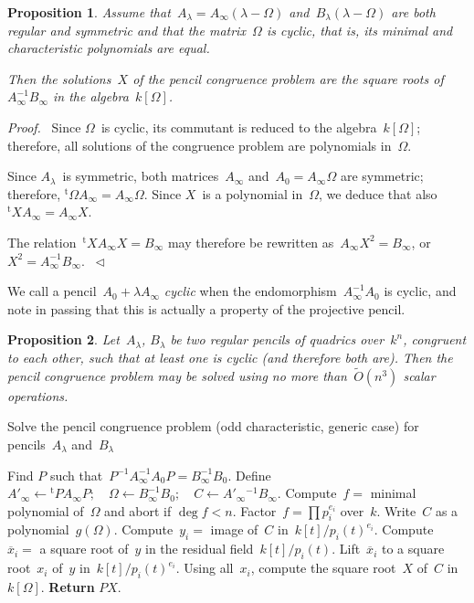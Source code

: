 \documentclass{article}
\newtheorem{prop}{Proposition}
\newenvironment{proof}{\textit{Proof.}~}{~$\lhd$}
\def\transpose#1{{}^{\mathrm{t}}\!#1}
\def\Otilde#1{\ensuremath{\widetilde O\left(#1\right)}}
\begin{document}
\begin{prop}
Assume that~$A_{\lambda} = A_{\infty} (\lambda - \Omega)$ and~$B_{\lambda} (\lambda - \Omega)$ are both regular
and symmetric and that the matrix~$\Omega$ is cyclic, that is, its minimal and
characteristic polynomials are equal.

Then the solutions~$X$ of the pencil congruence problem are the square
roots of~$A_{\infty}^{-1} B_{\infty}$ in the algebra~$k[\Omega]$.
\end{prop}

\begin{proof}
Since $\Omega$~is cyclic, its commutant is reduced to the algebra~$k[\Omega]$;
therefore, all solutions of the congruence problem are polynomials
in~$\Omega$.

Since $A_{\lambda}$~is symmetric, both matrices~$A_{\infty}$ and~$A_{0} = A_{\infty} \Omega$
are symmetric; therefore, $\transpose{\Omega} A_{\infty} = A_{\infty} \Omega$. Since $X$~is a
polynomial in~$\Omega$, we deduce that also~$\transpose{X} A_{\infty} = A_{\infty} X$.

The relation~$\transpose{X} A_{\infty} X = B_{\infty}$ may therefore be rewritten
as~$A_{\infty} X^2 = B_{\infty}$, or~$X^2 = A_{\infty}^{-1} B_{\infty}$.
\end{proof}

We call a pencil~$A_0 + \lambda A_{\infty}$ \emph{cyclic} when the
endomorphism~$A_{\infty}^{-1} A_0$ is cyclic, and note in passing that
this is actually a property of the projective pencil.

\begin{prop}
Let~$A_{\lambda}$, $B_{\lambda}$ be two regular pencils of quadrics
over~$k^n$, congruent to each other, such that at least one is cyclic
(and therefore both are). Then the pencil congruence problem may be
solved using no more than~\Otilde{n^3} scalar operations.
\end{prop}

\begin{algorithm}
\caption{Solve the pencil congruence problem (odd characteristic, generic
case) for pencils~$A_{\lambda}$ and~$B_{\lambda}$}
\begin{algorithmic}[1]
\State\label{step:jordan}%
  Find $P$ such that~$P^{-1} A_{\infty}^{-1} A_0 P =
	B_{\infty}^{-1} B_0$.
\State\label{step:define}%
  Define $A'_{\infty} \leftarrow \transpose{P} A_{\infty} P;
	\quad \Omega \leftarrow B_{\infty}^{-1} B_0;
	\quad C \leftarrow A'_{\infty}{}^{-1} B_{\infty}.$
\State\label{step:min}%
  Compute~$f = $ minimal polynomial of~$\Omega$ and abort if $\deg f < n$.
\State\label{step:factor}%
  Factor~$f = \prod p_i^{e_i}$ over~$k$.
\State \label{step:polynomial}%
  Write~$C$ as a polynomial~$g(\Omega)$.
  \State\label{step:crt1}%
	Compute~$y_i = $ image of~$C$ in~$k[t]/p_i(t)^{e_i}$.
	\State\label{step:root}%
	Compute~$\overline{x}_i = $ a square root of~$y$ in the residual
	field~$k[t]/p_i(t)$.
	\State\label{step:hensel}%
	Lift~$\overline{x}_i$ to a square root~$x_i$ of~$y$
	in~$k[t]/p_i(t)^{e_i}$.
\EndFor
\State\label{step:crt2}%
Using all~$x_i$, compute the square root~$X$ of~$C$ in~$k[\Omega]$.
\State\textbf{Return} $PX$.
\end{algorithmic}
\end{algorithm}
\end{document}
